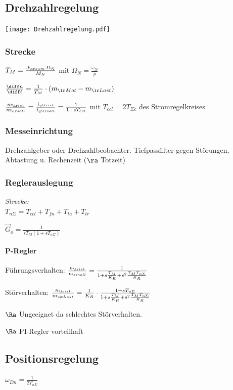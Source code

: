 \documentclass[fs, german]{latex4ei_fs}
\begin{document}
\begin{sectionbox}
\subsection{Drehzahlregelung}
\texttt{[image: Drehzahlregelung.pdf]}

\subsubsection*{Strecke}

$T_M = \frac{J_{\ir sum} \cdot \Omega_N}{M_N}$ mit $\Omega_N = \frac{\omega_N}{p}$

$\frac{\diff n}{\diff t} = \frac{1}{T_M} \cdot (m_{\ir Mot} - m_{\ir Last})$

$\frac{m_{\ir ist}}{m_{\ir soll}} = \frac{i_{q \ir ist}}{i_{q \ir soll}} = \frac{1}{1 + s T_{ccl}}$ mit $T_{ccl} = 2 T_{\Sigma c}$ des Stromregelkreises

\subsubsection*{Messeinrichtung} 

Drehzahlgeber oder Drehzahlbeobachter. Tiefpassfilter gegen Störungen, Abtastung u. Rechenzeit ($\ra$ Totzeit)

\subsubsection*{Reglerauslegung}

\emph{Strecke:} \\
$T_{n \Sigma} = T_{ccl} + T_{fn} + T_{ta} + T_{tr}$

$\vec G_o = \frac{1}{s T_M ( 1+ s T_{n \Sigma})}$ 

\paragraph*{P-Regler}

Führungsverhalten: $\frac{n_{\ir ist}}{n_{\ir soll}} = \frac{1}{1 + s \frac{T_M}{K_R} + s^2 \frac{T_M T_{n \Sigma}}{K_R}}$

Störverhalten: $\frac{n_{\ir ist}}{m_{\ir Last}} = \frac{1}{K_R} \cdot \frac{1 + s T_{n \Sigma}}{1 + s \frac{T_M}{K_R} + s^2 \frac{T_M T_{n \Sigma}}{K_R}}$

$\Ra $ Ungeeignet da schlechtes Störverhalten.

$\Ra$ PI-Regler vorteilhaft
\end{sectionbox}
\begin{sectionbox}
\subsection{Positionsregelung}
$\omega_{Dn} = \frac{1}{2 T_{n \Sigma}}$

\end{sectionbox}
\end{document}
